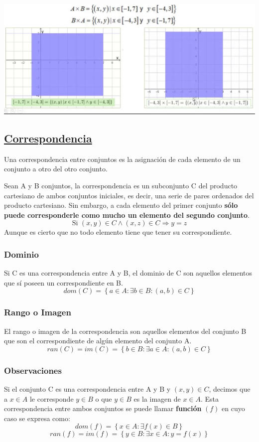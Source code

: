 \documentclass[10pt,a4paper,openright]{book}
\begin{document}
\begin{center}
\includegraphics[scale=0.5]{producto cartesiano}
\end{center}
 
\subsection*{\underline{Correspondencia}}
Una correspondencia entre conjuntos es la asignación de cada elemento de un conjunto a otro del otro conjunto.\par
Sean A y B conjuntos, la correspondencia es un subconjunto C del producto cartesiano de ambos conjuntos iniciales, es decir, una serie de pares ordenados del producto cartesiano. Sin embargo, a cada elemento del primer conjunto \textbf{sólo puede corresponderle como mucho un elemento del segundo conjunto}.
$$\mbox{Si }(x,y) \in C\wedge (x,z)\in C\Rightarrow y=z$$
Aunque es cierto que no todo elemento tiene que tener su correspondiente.
\subsubsection*{Dominio}
Si C es una correspondencia entre A y B, el dominio de C son aquellos elementos que sí poseen un correspondiente en B.
$$dom(C)=\left\lbrace a\in A : \exists b \in B : (a,b)\in C\right\rbrace$$
\subsubsection*{Rango o Imagen}
El rango o imagen de la correspondencia son aquellos elementos del conjunto B que son el correspondiente de algún elemento del conjunto A.
$$ran(C)=im(C)=\left\lbrace b\in B : \exists a \in A : (a,b)\in C\right\rbrace$$
\subsubsection*{Observaciones}
Si el conjunto C es una correspondencia entre A y B y $(x,y)\in C$, decimos que a $x\in A$ le corresponde $y\in B$ o que $y\in B$ es la imagen de $x \in A$. Esta correspondencia entre ambos conjuntos se puede llamar \textbf{función} $(f)$ en cuyo caso se expresa como:
$$dom(f)=\left\lbrace x \in A : \exists f(x)\in B\right\rbrace$$
$$ran(f)=im(f)=\left\lbrace y\in B : \exists x \in A : y=f(x)\right\rbrace$$
\end{document}
